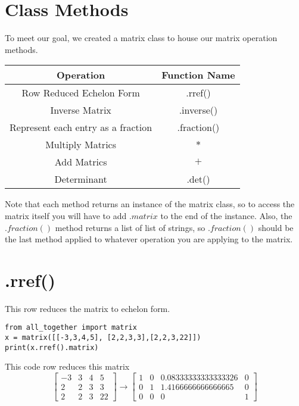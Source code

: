 \documentclass{article}
\begin{document}
\section{Class Methods}
To meet our goal, we created a matrix class to house our matrix operation methods. 
\begin{center}
\begin{tabular}{||c|c||}
    \hline
    Operation & Function Name \\ [0.5ex]
    \hline\hline
    Row Reduced Echelon Form & .rref() \\
    Inverse Matrix & .inverse() \\
    Represent each entry as a fraction & .fraction() \\
    Multiply Matrics & \(*\) \\
    Add Matrics & \(+\) \\ 
    Determinant & .det() \\[1ex] 
    \hline 
\end{tabular}
\end{center}
Note that each method returns an instance of the matrix class, so to access the matrix itself you will have to add \(.matrix\) to the end of the instance. 
Also, the \(.fraction()\) method returns a list of list of strings, so \(.fraction()\) should be the last method applied to whatever operation you are applying to the
matrix. 

\section{.rref()}
This row reduces the matrix to echelon form. 
\begin{lstlisting}
from all_together import matrix
x = matrix([[-3,3,4,5], [2,2,3,3],[2,2,3,22]])
print(x.rref().matrix) 
\end{lstlisting}
This code row reduces this matrix 
\begin{equation}
\left[
\begin{array}{cccc}
    -3 & 3 & 4 &5   \\
     2&2&3&3 \\
     2&2&3&22
\end{array}
\right]
\rightarrow
\left[
\begin{array}{cccc}
    1 & 0 & 0.08333333333333326 &0   \\
     0&1& 1.4166666666666665&0 \\
     0&0&0&1
\end{array}
\right]
\end{equation}
\end{document}
